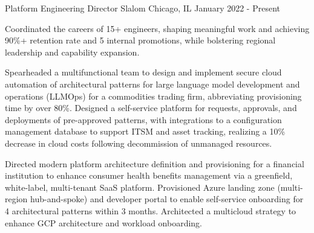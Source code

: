 

\begin{cventries}

  \cventry
    {Platform Engineering Director} %
    {Slalom} %
    {Chicago, IL} %
    {January 2022 - Present} %
    {
      \begin{cvitems} %
        \item {Coordinated the careers of 15+ engineers, shaping meaningful work and achieving 90\%+ retention rate and 5 internal promotions, while bolstering regional leadership and capability expansion.}
        \item {Spearheaded a multifunctional team to design and implement secure cloud automation of architectural patterns for large language model development and operations (LLMOps) for a commodities trading firm, abbreviating provisioning time by over 80\%. Designed a self-service platform for requests, approvals, and deployments of pre-approved patterns, with integrations to a configuration management database to support ITSM and asset tracking, realizing a 10\% decrease in cloud costs following decommission of unmanaged resources.}
        \item {Directed modern platform architecture definition and provisioning for a financial institution to enhance consumer health benefits management via a greenfield, white-label, multi-tenant SaaS platform. Provisioned Azure landing zone (multi-region hub-and-spoke) and developer portal to enable self-service onboarding for 4 architectural patterns within 3 months. Architected a multicloud strategy to enhance GCP architecture and workload onboarding.}
      \end{cvitems}
    }


\end{cventries}
